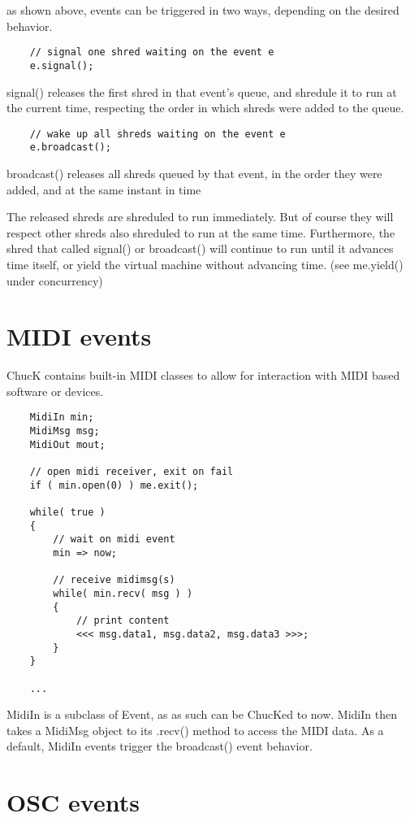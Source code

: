 as shown above, events can be triggered in two ways, depending on the desired behavior.
\begin{verbatim}
    // signal one shred waiting on the event e
    e.signal();
\end{verbatim}

signal() releases the  first shred in that event's queue, and shredule it to run at the current time, respecting the order in which shreds were added to the queue.
\begin{verbatim}
    // wake up all shreds waiting on the event e
    e.broadcast();
\end{verbatim}

broadcast() releases  all shreds queued by that event, in the order they were added, and at the same instant in time

The released shreds are shreduled to run immediately. But of course they will respect other shreds also shreduled to run at the same time. Furthermore, the shred that called signal() or broadcast() will continue to run until it advances time itself, or yield the virtual machine without advancing time. (see me.yield() under concurrency)
 

\section{MIDI events}

ChucK contains built-in MIDI classes to allow for interaction with MIDI based software or devices.
\begin{verbatim}
    MidiIn min;
    MidiMsg msg;
    MidiOut mout;

    // open midi receiver, exit on fail
    if ( min.open(0) ) me.exit(); 

    while( true )
    {
        // wait on midi event
        min => now;

        // receive midimsg(s)
        while( min.recv( msg ) )
        {
            // print content
            <<< msg.data1, msg.data2, msg.data3 >>>;
        }
    }

    ...
\end{verbatim}


MidiIn is a subclass of Event, as as such can be ChucKed to now. MidiIn then takes a MidiMsg object to its .recv() method to access the MIDI data.
 As a default, MidiIn events trigger the broadcast() event behavior.
 

\section{OSC events}

